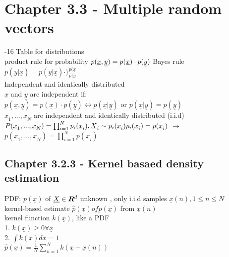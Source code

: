 \section{Chapter 3.3 - Multiple random vectors}
-16 Table for distributions \\
\textbullet product rule for probability
$p(\underline{x } , \underline{ y } ) = p(\underline{x }) \cdot p( \underline{y }) \\$
\textbullet Bayes rule
$ p( \underline{y } | \underline{x } ) = p( \underline{y } | \underline{x } ) \cdot ) \frac{ p(\underline{x }}{ p(\underline{y }}$ \\
\textbullet Independent and identically distributed \\
$ \underline{x} $ and $ \underline{y}$ are independent if: \\
$p (\underline{x}, \underline{y}) = p (\underline{x}) \cdot p(\underline{y}) \leftrightarrow p(\underline{x}| \underline{y}) $ or $ p(\underline{x} | \underline{y}) = p ( \underline{y})$ \\
$ \underline{x}_1 ,... ,\underline{x}_N$ are independent and identically distributed (i.i.d)\\
$P(\underline{x}_1, ..., \underline{x}_N) = \prod_ {i = 1 }^{N } p_i (\underline{x}_i), \underline{X}_i \sim p_i (\underline{x}_i) \\
p_i (\underline{x}_i ) = p(\underline{x}_i) $
$\rightarrow$  $p(\underline{x}_1 , ..., \underline{x}_N) = \prod_{ i=1 } ^{N } p(\underline{x}_i)$ \\
\subsection{ Chapter 3.2.3 - Kernel basaed density estimation }
PDF: $ p(\underline{x}) $ of $ \underline{X} \in {\boldsymbol R}^d $ unknown , only i.i.d samples $ \underline{x}(n), 1 \leq n \leq N$ \\
kernel-based estimate $ \hat { p } (\underline{x}) of p(\underline{x})$ from $ \underline{x}(n)$ \\
kernel function $ k(\underline{x})$, like a PDF \\
1. $ k(\underline{x}) \geq 0 \forall \underline{x}$ \\
2. $\int k(\underline{x}) d \underline{x} = 1$ \\
$ \hat { p } (\underline{x}) = \frac{1}{N} \sum_ {n=1 } ^N k (\underline{x} - \underline{x} (n)) $ \\
 \\

